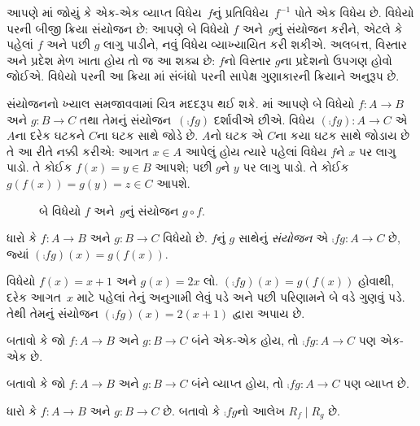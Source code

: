 \begin{explain}
આપણે માં
જોયું કે એક-એક વ્યાપ્ત વિધેય~$f$નું પ્રતિવિધેય~$f^{-1}$
પોતે એક વિધેય છે. વિધેયો પરની બીજી ક્રિયા સંયોજન છે:
આપણે બે વિધેયો $f$ અને~$g$નું સંયોજન કરીને,
એટલે કે પહેલાં $f$ અને પછી $g$ લાગુ પાડીને, નવું વિધેય
વ્યાખ્યાયિત કરી શકીએ. અલબત્ત, વિસ્તાર અને પ્રદેશ મેળ ખાતા
હોય તો જ આ શક્ય છે: $f$નો વિસ્તાર $g$ના પ્રદેશનો
ઉપગણ હોવો જોઈએ. વિધેયો
પરની આ ક્રિયા માં સંબંધો પરની
સાપેક્ષ ગુણાકારની ક્રિયાને અનુરૂપ છે.

સંયોજનનો ખ્યાલ સમજાવવામાં ચિત્ર મદદરૂપ થઈ શકે.
માં આપણે બે વિધેયો
$f \colon A \to B$ અને $g \colon B \to C$
તથા તેમનું સંયોજન~$(\comp{f}{g})$ દર્શાવીએ છીએ.
વિધેય $(\comp{f}{g}) \colon A \to C$ એ $A$ના દરેક
ઘટકને $C$ના ઘટક સાથે જોડે છે.
$A$નો ઘટક એ $C$ના કયા ઘટક
સાથે જોડાય છે તે આ રીતે નક્કી કરીએ: આગત $x \in
A$ આપેલું હોય ત્યારે પહેલાં વિધેય $f$ને $x$ પર લાગુ પાડો.
તે કોઈક $f(x)
= y \in B$ આપશે; પછી $g$ને $y$ પર લાગુ પાડો.
તે કોઈક $g(f(x)) = g(y) = z \in C$ આપશે.
\begin{figure}
  \caption{બે વિધેયો $f$ અને~$g$નું સંયોજન $g \circ f$.}
\end{figure}
\end{explain}

\begin{defn}[સંયોજન]
ધારો કે $f\colon A \to B$ અને $g\colon B \to C$
વિધેયો છે. $f$નું $g$ સાથેનું \emph{સંયોજન}
એ $\comp{f}{g} \colon A \to C$ છે, જ્યાં
$(\comp{f}{g})(x) = g(f(x))$.
\end{defn}

\begin{ex}
વિધેયો $f(x) = x + 1$ અને $g(x) = 2x$ લો.
$(\comp{f}{g})(x) = g(f(x))$ હોવાથી, દરેક આગત~$x$
માટે પહેલાં તેનું અનુગામી લેવું પડે અને પછી પરિણામને
બે વડે ગુણવું પડે. તેથી તેમનું સંયોજન
$(\comp{f}{g})(x) = 2(x+1)$ દ્વારા અપાય છે.
\end{ex}

\begin{prob}
બતાવો કે જો $f \colon A \to B$ અને $g \colon B \to C$
બંને એક-એક હોય, તો $\comp{f}{g}\colon A \to C$
પણ એક-એક છે.
\end{prob}

\begin{prob}
બતાવો કે જો $f \colon A \to B$ અને $g \colon B \to C$
બંને વ્યાપ્ત હોય, તો $\comp{f}{g}\colon A \to C$
પણ વ્યાપ્ત છે.
\end{prob}

\begin{prob}
ધારો કે $f \colon A \to B$ અને $g \colon B \to C$ છે.
બતાવો કે $\comp{f}{g}$નો આલેખ $R_f \mid R_g$ છે.
\end{prob}
\endgroup



